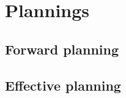 

\chapter{Plannings} \label{annexe_planning}

\section{Forward planning}

\section{Effective planning}
